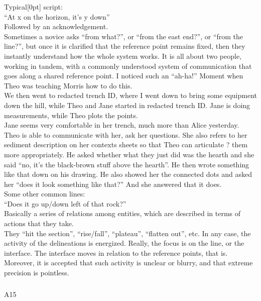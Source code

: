 \documentclass[
]{article}
\makeatletter
\let\oldsubparagraph\subparagraph
\renewcommand{\subparagraph}{
    \@ifstar
      \xxxSubParagraphStar
      \xxxSubParagraphNoStar
  }
\newcommand{\xxxSubParagraphStar}[1]{\oldsubparagraph*{#1}\mbox{}}
\newcommand{\xxxSubParagraphNoStar}[1]{\oldsubparagraph{#1}\mbox{}}
\newcommand{\paragraphnumber}[1]{\marginnote{\color{lightgray}\tiny{#1}}[0pt]}
\makeatother
\begin{document}
Typical\paragraphnumber{[108]} script:\\
``At x on the horizon, it's y down''\\
Followed by an acknowledgement.\\
Sometimes a novice asks ``from what?'', or ``from the east end?'', or
``from the line?'', but once it is clarified that the reference point
remains fixed, then they instantly understand how the whole system
works. It is all about two people, working in tandem, with a commonly
understood system of communication that goes along a shared reference
point. I noticed such an ``ah-ha!'' Moment when Theo was teaching Morris
how to do this.\\
We then went to redacted trench ID, where I went down to bring some
equipment down the hill, while Theo and Jane started in redacted trench
ID. Jane is doing measurements, while Theo plots the points.\\
Jane seems very comfortable in her trench, much more than Alice
yesterday.\\
Theo is able to communicate with her, ask her questions. She also refers
to her sediment description on her contexts sheets so that Theo can
articulate ? them more appropriately. He asked whether what they just
did was the hearth and she said ``no, it's the black-brown stuff above
the hearth''. He then wrote something like that down on his drawing. He
also showed her the connected dots and asked her ``does it look
something like that?'' And she answered that it does.\\
Some other common lines:\\
``Does it go up/down left of that rock?''\\
Basically a series of relations among entities, which are described in
terms of actions that they take.\\
They ``hit the section'', ``rise/fall'', ``plateau'', ``flatten out'',
etc. In any case, the activity of the delineations is energized. Really,
the focus is on the line, or the interface. The interface moves in
relation to the reference points, that is. Moreover, it is accepted that
such activity is unclear or blurry, and that extreme precision is
pointless.

\subparagraph{A15}\label{sec-A15}
\end{document}
